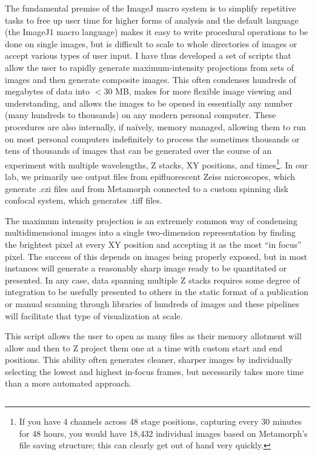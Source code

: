 The fundamental premise of the ImageJ macro system is to simplify repetitive tasks to free up user time for higher forms of analysis and the default language (the ImageJ1 macro language) makes it easy to write procedural operations to be done on single images, but is difficult to scale to whole directories of images or accept various types of user input. I have thus developed a set of scripts that allow the user to rapidly generate maximum\hyp{}intensity projections from sets of images and then generate composite images. This often condenses hundreds of megabytes of data into $<$30 MB, makes for more flexible image viewing and understanding, and allows the images to be opened in essentially any number (many hundreds to thousands) on any modern personal computer. These procedures are also internally, if na\"{i}vely, memory managed, allowing them to run on most personal computers indefinitely to process the sometimes thousands or tens of thousands of images that can be generated over the course of an experiment with multiple wavelengths, Z stacks, XY positions, and times\footnote{If you have 4 channels across 48 stage positions, capturing every 30 minutes for 48 hours, you would have 18,432 individual images based on Metamorph's file saving structure; this can clearly get out of hand very quickly.}. In our lab, we primarily use output files from epifluorescent Zeiss microscopes, which generate .czi files and from Metamorph connected to a custom spinning disk confocal system, which generates .tiff files.

The maximum intensity projection is an extremely common way of condensing multidimensional images into a single two\hyp{}dimension representation by finding the brightest pixel at every XY position and accepting it as the most ``in focus'' pixel. The success of this depends on images being properly exposed, but in most instances will generate a reasonably sharp image ready to be quantitated or presented. In any case, data spanning multiple Z stacks requires some degree of integration to be usefully presented to others in the static format of a publication or manual scanning through libraries of hundreds of images and these pipelines will facilitate that type of visualization at scale.

\begin{code}
\caption{This script allows the user to open as many files as their memory allotment will allow and then to Z project them one at a time with custom start and end positions. This ability often generates cleaner, sharper images by individually selecting the lowest and highest in\hyp{}focus frames, but necessarily takes more time than a more automated approach.}
\label{slowmanmip}

\inputminted[breaklines,frame=single,fontsize=\small]{python}{source/manMIPper.py}

\end{code}

